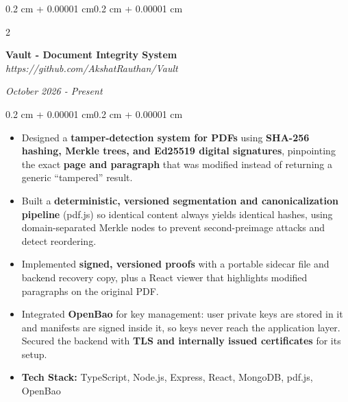 \documentclass[10pt, letterpaper]{article}
\newenvironment{highlights}{
    \begin{itemize}[
        topsep=0.06 cm,
        parsep=0.06 cm,
        partopsep=0pt,
        itemsep=0pt,
        leftmargin=0.4 cm + 10pt
    ]
}{
    \end{itemize}
}
\newenvironment{onecolentry}{
    \begin{adjustwidth}{0.2 cm + 0.00001 cm}{0.2 cm + 0.00001 cm}
}{
    \end{adjustwidth}
}
\newenvironment{twocolentry}[2][]{
    \onecolentry
    \def\secondColumn{#2}
    \setcolumnwidth{\fill, 4.5 cm}
    \begin{paracol}{2}
}{
    \switchcolumn \raggedleft \secondColumn
    \end{paracol}
    \endonecolentry
}
\begin{document}
    \begin{twocolentry}{\textit{October 2026 - Present}}
        \textbf{Vault - Document Integrity System} \quad
        \textit{https://github.com/AkshatRauthan/Vault}
    \end{twocolentry}
    \vspace{0.10 cm}
    \begin{onecolentry}
        \begin{highlights}
            \item Designed a \textbf{tamper-detection system for PDFs} using \textbf{SHA-256 hashing, Merkle trees, and Ed25519 digital signatures}, pinpointing 
                the exact \textbf{page and paragraph} that was modified instead of returning a generic ``tampered'' result.
            \item Built a \textbf{deterministic, versioned segmentation and canonicalization pipeline} (pdf.js) so identical content always yields identical hashes, 
                using domain-separated Merkle nodes to prevent second-preimage attacks and detect reordering.
            \item Implemented \textbf{signed, versioned proofs} with a portable sidecar file and backend recovery copy, plus a React viewer that highlights 
                modified paragraphs on the original PDF.
            \item Integrated \textbf{OpenBao} for key management: user private keys are stored in it and manifests are signed inside it, so keys never reach the 
                application layer. Secured the backend with \textbf{TLS and internally issued certificates} for its setup.
            \item \textbf{Tech Stack:} TypeScript, Node.js, Express, React, MongoDB, pdf.js, OpenBao
        \end{highlights}
    \end{onecolentry}
    \vspace{0.3 cm}
\end{document}

